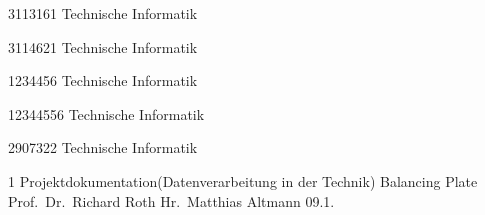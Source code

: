 \documentclass[12pt,a4paper,bibliography=totoc,listof=totoc]{scrartcl}
\begin{document}
{3113161}						%
{Technische Informatik}			%

{3114621}						%
{Technische Informatik}			%

{1234456}						%
{Technische Informatik}			%

{12344556}						%
{Technische Informatik}			%

{2907322}						%
{Technische Informatik}			%


\MyTitelseite{}
{1}								%
{Projektdokumentation(Datenverarbeitung in der Technik)}			%
{Balancing Plate}				%
{Prof.\ Dr.\ Richard Roth}   %
{ Hr.\ Matthias Altmann}	%
{09.1.\the\year}				%

\setcounter{page}{1} 




\tableofcontents
\pagebreak
\end{document}
